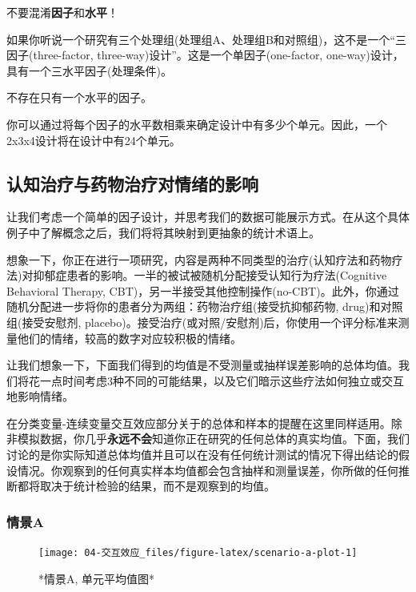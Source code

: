 \documentclass[
]{book}
\begin{document}
不要混淆\textbf{因子}和\textbf{水平}！

如果你听说一个研究有三个处理组(处理组A、处理组B和对照组)，这不是一个``三因子(three-factor, three-way)设计''。这是一个单因子(one-factor, one-way)设计，具有一个三水平因子(处理条件)。

不存在只有一个水平的因子。

你可以通过将每个因子的水平数相乘来确定设计中有多少个单元。因此，一个2x3x4设计将在设计中有24个单元。

\hypertarget{ux8ba4ux77e5ux6cbbux7597ux4e0eux836fux7269ux6cbbux7597ux5bf9ux60c5ux7eeaux7684ux5f71ux54cd}{%
\subsection{认知治疗与药物治疗对情绪的影响}\label{ux8ba4ux77e5ux6cbbux7597ux4e0eux836fux7269ux6cbbux7597ux5bf9ux60c5ux7eeaux7684ux5f71ux54cd}}

让我们考虑一个简单的因子设计，并思考我们的数据可能展示方式。在从这个具体例子中了解概念之后，我们将将其映射到更抽象的统计术语上。

想象一下，你正在进行一项研究，内容是两种不同类型的治疗(认知疗法和药物疗法)对抑郁症患者的影响。一半的被试被随机分配接受认知行为疗法(Cognitive Behavioral Therapy, CBT)，另一半接受其他控制操作(no-CBT)。此外，你通过随机分配进一步将你的患者分为两组：药物治疗组(接受抗抑郁药物, drug)和对照组(接受安慰剂, placebo)。接受治疗(或对照/安慰剂)后，你使用一个评分标准来测量他们的情绪，较高的数字对应较积极的情绪。

让我们想象一下，下面我们得到的均值是不受测量或抽样误差影响的总体均值。我们将花一点时间考虑3种不同的可能结果，以及它们暗示这些疗法如何独立或交互地影响情绪。

在分类变量-连续变量交互效应部分关于的总体和样本的提醒在这里同样适用。除非模拟数据，你几乎\textbf{永远不会}知道你正在研究的任何总体的真实均值。下面，我们讨论的是你实际知道总体均值并且可以在没有任何统计测试的情况下得出结论的假设情况。你观察到的任何真实样本均值都会包含抽样和测量误差，你所做的任何推断都将取决于统计检验的结果，而不是观察到的均值。

\hypertarget{ux60c5ux666fa}{%
\subsubsection*{情景A}\label{ux60c5ux666fa}}

\begin{figure}
\texttt{[image: 04-交互效应\_files/figure-latex/scenario-a-plot-1]} \caption{*情景A, 单元平均值图*}\label{fig:scenario-a-plot}
\end{figure}
\end{document}
